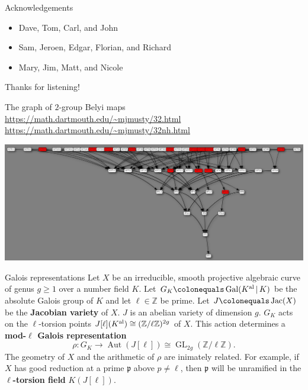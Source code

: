 \documentclass[xcolor=dvipsnames]{beamer}
\theoremstyle{plain}
\newcommand{\ZZ}{\mathbb Z}
\newcommand{\Kal}{{{K}^{\textup{al}}}}
\DeclareMathOperator{\Aut}{Aut}
\DeclareMathOperator{\Gal}{Gal}
\DeclareMathOperator{\GL}{GL}
\DeclareMathOperator{\Jac}{Jac}
\begin{document}
  \begin{frame}{Acknowledgements}
    \begin{itemize}
      \item
        Dave, Tom, Carl, and John
      \item
        Sam, Jeroen, Edgar, Florian, and Richard
      \item
        Mary, Jim, Matt, and Nicole
    \end{itemize}
    \pause
    \begin{center}
      {\Huge Thanks for listening!}
    \end{center}
  \end{frame}
  \appendix
  \begin{frame}{The graph of $2$-group Belyi maps}
    \url{https://math.dartmouth.edu/~mjmusty/32.html}
    \newline
    \url{https://math.dartmouth.edu/~mjmusty/32nh.html}
    \begin{center}
      \includegraphics[scale=0.17]{32.png}
    \end{center}
  \end{frame}
  \begin{frame}{Galois representations}
    Let $X$ be an irreducible, smooth
    projective algebraic curve of genus $g\geq 1$
    over a number field $K$.
    Let $G_K\colonequals\Gal(\Kal\,|\,K)$ be
    the absolute Galois group of $K$ and
    let $\ell\in\ZZ$ be prime.
    \newline
    Let $J\colonequals\Jac(X)$ be the
    \textbf{Jacobian variety} of $X$.
    $J$ is an abelian variety of dimension $g$.
    \newline
    $G_K$ acts on the $\ell$-torsion points
    $J[\ell](\Kal)\cong(\ZZ/\ell\ZZ)^{2g}$ of $X$.
    \newline
    This action determines a
    \textbf{mod-$\ell$ Galois representation}
    \[
      \rho\colon G_K\to\Aut(J[\ell])\cong\GL_{2g}(\ZZ/\ell\ZZ).
    \]
    The geometry of $X$ and the arithmetic of
    $\rho$ are inimately related.
    For example,
    if $X$ has good reduction at a prime
    $\mathfrak{p}$ above
    $p\neq\ell$,
    then $\mathfrak{p}$
    will be unramified in the
    \textbf{$\ell$-torsion field}
    $K(J[\ell])$.
  \end{frame}
\end{document}
